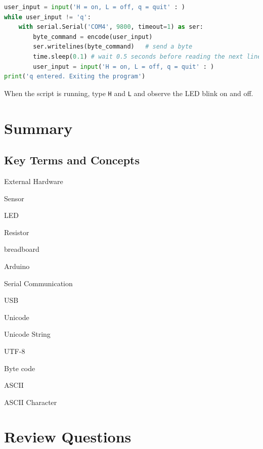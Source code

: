 \documentclass{book}
\begin{document}
    
        \begin{lstlisting}[language=Python]
user_input = input('H = on, L = off, q = quit' : )
while user_input != 'q':
    with serial.Serial('COM4', 9800, timeout=1) as ser:
        byte_command = encode(user_input)
        ser.writelines(byte_command)   # send a byte
        time.sleep(0.1) # wait 0.5 seconds before reading the next line
        user_input = input('H = on, L = off, q = quit' : )
print('q entered. Exiting the program')
\end{lstlisting}
    




    
        When the script is running, type \lstinline!H! and \lstinline!L! and
observe the LED blink on and off.
    




    
        \section{Summary}\label{summary}
    




    
        \subsection{Key Terms and Concepts}\label{key-terms-and-concepts}
    




    
        External Hardware

Sensor

LED

Resistor

breadboard

Arduino

Serial Communication

USB

Unicode

Unicode String

UTF-8

Byte code

ASCII

ASCII Character
    




    
        \section{Review Questions}\label{review-questions}
    
\end{document}
